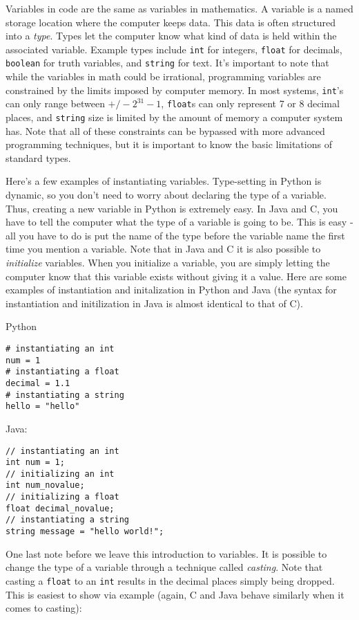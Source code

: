 \documentclass[a4paper]{article}
\begin{document}
Variables in code are the same as variables in mathematics. A variable is a named storage location where the computer keeps data. This data is often structured into a {\it type}. Types let the computer know what kind of data is held within the associated variable. Example types include \texttt{int} for integers, \texttt{float} for decimals, \texttt{boolean} for truth variables, and \texttt{string} for text. It's important to note that while the variables in math could be irrational, programming variables are constrained by the limits imposed by computer memory. In most systems, \texttt{int}'s can only range between $+/- 2^{31} - 1$, \texttt{float}s can only represent 7 or 8 decimal places, and \texttt{string} size is limited by the amount of memory a computer system has. Note that all of these constraints can be bypassed with more advanced programming techniques, but it is important to know the basic limitations of standard types.

Here's \ex a few examples of instantiating variables. Type-setting in Python is dynamic, so you don't need to worry about declaring the type of a variable. Thus, creating a new variable in Python is extremely easy. In Java and C, you have to tell the computer what the type of a variable is going to be. This is easy - all you have to do is put the name of the type before the variable name the first time you mention a variable. Note that in Java and C it is also possible to {\it initialize} variables. When you initialize a variable, you are simply letting the computer know that this variable exists without giving it a value. Here are some examples of instantiation and initalization in Python and Java (the syntax for instantiation and initilization in Java is almost identical to that of C).

Python
\begin{verbatim}
# instantiating an int
num = 1
# instantiating a float
decimal = 1.1
# instantiating a string
hello = "hello"
\end{verbatim}

Java:
\begin{verbatim}
// instantiating an int
int num = 1;
// initializing an int
int num_novalue;
// initializing a float
float decimal_novalue;
// instantiating a string
string message = "hello world!";
\end{verbatim}

One \info last note before we leave this introduction to variables. It is possible to change the type of a variable through a technique called {\it casting}. Note that casting a \texttt{float} to an \texttt{int} results in the decimal places simply being dropped. This is easiest to show via example (again, C and Java behave similarly when it comes to casting):
\end{document}
